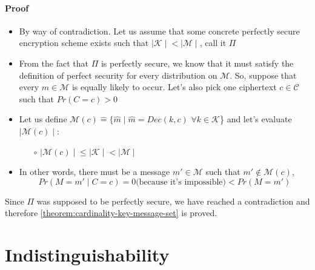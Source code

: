 \documentclass[../main]{subfiles}
\begin{document}
\paragraph{Proof}
    \begin{itemize}
        \item By way of contradiction. Let us assume that some concrete perfectly secure encryption scheme exists such that $\mid{} \mathcal{K}\mid{} < \mid{}\mathcal{M}\mid{}$, call it $\Pi$
        \item From the fact that $\Pi$ is perfectly secure, we know that it must satisfy the definition of perfect security for every distribution on $\mathcal{M}$. So, suppose that every $m \in{} \mathcal{M}$ is equally likely to occur. Let's also pick one ciphertext $c \in{} \mathcal{C}$ such that $Pr(C=c) > 0$
        \item Let us define $\mathcal{M}(c) \hat{=} \{\hat{m} \mid{} \hat{m} = Dec(k,c)$ $\forall k \in{} \mathcal{K}$\} and let's evaluate $\mid{} \mathcal{M}(c) \mid{}$:
        \begin{itemize}
            \item[$\circ$] $\mid{}\mathcal{M}(c)\mid{} \leq \mid{}\mathcal{K}\mid{} < \mid{}\mathcal{M}\mid{}$
        \end{itemize}
        \item In other words, there must be a message $m' \in{} \mathcal{M}$ such that $m' \notin{} \mathcal{M}(c)$, $$Pr(M=m' \mid C=c) = 0 \text{(because it's impossible)} < Pr(M=m')$$
    \end{itemize}
    Since $\Pi$ was supposed to be perfectly secure, we have reached a contradiction and therefore \ref{theorem:cardinality-key-message-set} is proved.
\newpage
\section{Indistinguishability}
\end{document}
